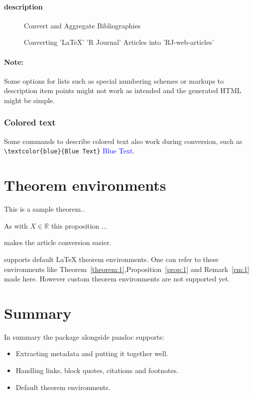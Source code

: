\paragraph{description}
\begin{description}
\item[] Convert and Aggregate Bibliographies
\item[] Converting 'LaTeX' 'R Journal' Articles into 'RJ-web-articles'
\end{description}

\paragraph{Note:}
Some options for lists such as special numbering schemes or markups to description
item points might not work as intended and the generated HTML might be simple.

\subsubsection{Colored text}
Some commands to describe colored text also work during conversion, such as
\verb|\textcolor{blue}{Blue Text}|  \textcolor{blue}{Blue Text}.

\section{Theorem environments}

\begin{theorem}\label{theorem:1}
This is a sample theorem..
\end{theorem}

\begin{proposition}\label{prop:1}
As with $X \in \mathbb{R}$ this proposition ...  
\end{proposition}

\begin{remark}\label{rm:1}
 makes the article conversion easier.
\end{remark}

 supports default LaTeX theorem environments. One can refer to these environments
like Theorem~\ref{theorem:1},Proposition~\ref{prop:1} and Remark~\ref{rm:1} made here.
However custom theorem environments are not supported yet.

\section{Summary}
In summary the  package alongside pandoc supports:
\begin{itemize}
\item Extracting metadata and putting it together well.
\item Handling links, block quotes, citations and footnotes.
\item Default theorem environments.
\end{itemize}

